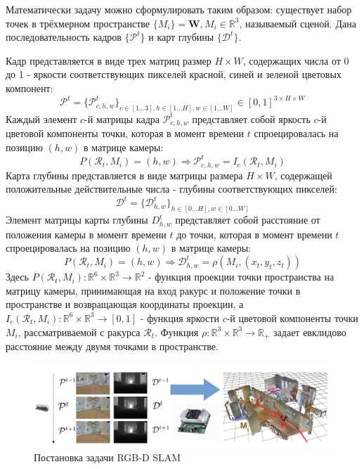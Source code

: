 \documentclass{mipt-thesis-ms}
\begin{document}
	Математически задачу можно сформулировать таким образом: существует набор точек в трёхмерном пространстве $\{M_i \} = \textbf{W}, M_i \in \mathbb{R}^3$, называемый сценой. Дана последовательность кадров $\{\mathcal{P}^t\}$ и карт глубины $\{\mathcal{D}^t\}$.
	
	Кадр представляется в виде трех матриц размер $H \times W$, содержащих числа от 0 до 1 - яркости соответствующих пикселей красной, синей и зеленой цветовых компонент:
	$$\mathcal{P}^t = \{\mathcal{P}^t_{c,h,w}\}_{c \in [1 \dots 3], h \in [1 \dots H], w \in [1 \dots W]} \in [0, 1]^{3 \times H \times W}$$
	Каждый элемент $c$-й матрицы кадра $\mathcal{P}^t_{c,h,w}$ представляет собой яркость $c$-й цветовой компоненты точки, которая в момент времени $t$ спроецировалась на позицию $(h, w)$ в матрице камеры:
	$$P(\mathcal{R}_t, M_i) = (h, w) \Rightarrow \mathcal{P}^t_{c,h,w} = I_c(\mathcal{R}_t, M_i)$$
	Карта глубины представляется в виде матрицы размера $H \times W$, содержащей положительные действительные числа - глубины соответствующих пикселей:
	$$\mathcal{D}^t = \{\mathcal{D}^t_{h,w}\}_{h \in [0 \dots H], w \in [0 \dots W]}$$
	Элемент матрицы карты глубины $D^t_{h,w}$ представляет собой расстояние от положения камеры в момент времени $t$ до точки, которая в момент времени $t$ спроецировалась на позицию $(h, w)$ в матрице камеры: 
	$$P(\mathcal{R}_t, M_i) = (h, w) \Rightarrow \mathcal{D}^t_{h,w} = \rho(M_i, (x_t, y_t, z_t))$$
	Здесь $P(\mathcal{R}_t, M_i): \mathbb{R}^6 \times \mathbb{R}^3 \rightarrow \mathbb{R}^2$ - функция проекции точки пространства на матрицу камеры, принимающая на вход ракурс и положение точки в пространстве и возвращающая координаты проекции, а $I_c (\mathcal{R}_t, M_i): \mathbb{R}^6 \times \mathbb{R}^3 \rightarrow [0, 1]$ - функция яркости $c$-й цветовой компоненты точки $M_i$, рассматриваемой с ракурса $\mathcal{R}_t$. Функция $\rho: \mathbb{R}^3 \times \mathbb{R}^3 \rightarrow \mathbb{R}_{+}$ задает евклидово расстояние между двумя точками в пространстве.
	
	\begin{figure}
		\includegraphics[width=1.0\textwidth]{img/rgbdslam_problem_setting_1.png}
		\caption{Постановка задачи RGB-D SLAM}
		\label{figure_rgbdslam_setting}
	\end{figure}
	
\end{document}
